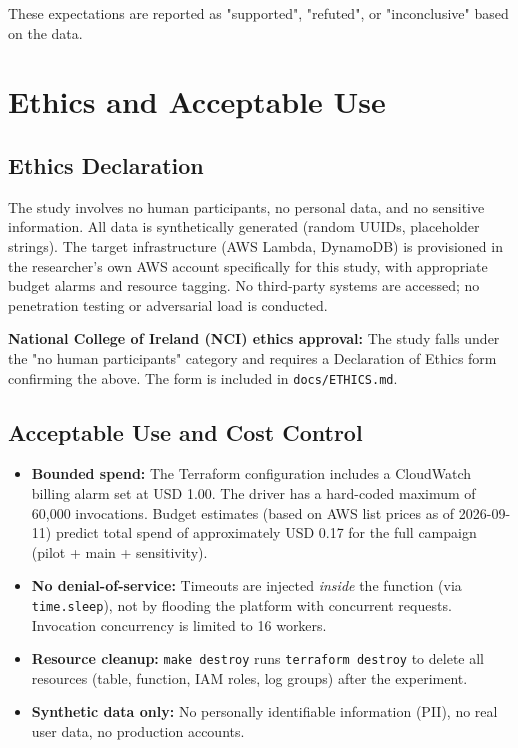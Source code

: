 These expectations are reported as "supported", "refuted", or "inconclusive" based on the data.

\section{Ethics and Acceptable Use}

\subsection{Ethics Declaration}

The study involves no human participants, no personal data, and no sensitive information. All data is synthetically generated (random UUIDs, placeholder strings). The target infrastructure (AWS Lambda, DynamoDB) is provisioned in the researcher's own AWS account specifically for this study, with appropriate budget alarms and resource tagging. No third-party systems are accessed; no penetration testing or adversarial load is conducted.

\textbf{National College of Ireland (NCI) ethics approval:} The study falls under the "no human participants" category and requires a Declaration of Ethics form confirming the above. The form is included in \texttt{docs/ETHICS.md}.

\subsection{Acceptable Use and Cost Control}

\begin{itemize}
    \item \textbf{Bounded spend:} The Terraform configuration includes a CloudWatch billing alarm set at USD 1.00. The driver has a hard-coded maximum of 60,000 invocations. Budget estimates (based on AWS list prices as of 2026-09-11) predict total spend of approximately USD 0.17 for the full campaign (pilot + main + sensitivity).
    \item \textbf{No denial-of-service:} Timeouts are injected \textit{inside} the function (via \texttt{time.sleep}), not by flooding the platform with concurrent requests. Invocation concurrency is limited to 16 workers.
    \item \textbf{Resource cleanup:} \texttt{make destroy} runs \texttt{terraform destroy} to delete all resources (table, function, IAM roles, log groups) after the experiment.
    \item \textbf{Synthetic data only:} No personally identifiable information (PII), no real user data, no production accounts.
\end{itemize}

